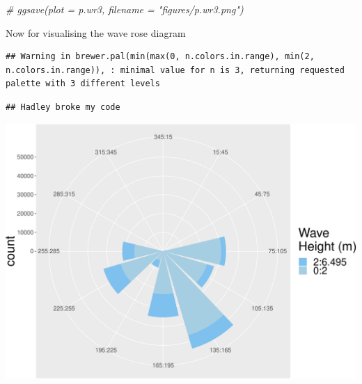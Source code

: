 \documentclass[10pt,A4,]{article}
\makeatletter
\newenvironment{Shaded}{\begin{snugshade}}{\end{snugshade}}
\newcommand{\KeywordTok}[1]{\textcolor[rgb]{0.13,0.29,0.53}{\textbf{#1}}}
\newcommand{\DataTypeTok}[1]{\textcolor[rgb]{0.13,0.29,0.53}{#1}}
\newcommand{\StringTok}[1]{\textcolor[rgb]{0.31,0.60,0.02}{#1}}
\newcommand{\CommentTok}[1]{\textcolor[rgb]{0.56,0.35,0.01}{\textit{#1}}}
\newcommand{\OperatorTok}[1]{\textcolor[rgb]{0.81,0.36,0.00}{\textbf{#1}}}
\newcommand{\NormalTok}[1]{#1}
\def\maxwidth{\ifdim\Gin@nat@width>\linewidth\linewidth
\else\Gin@nat@width\fi}
\let\Oldincludegraphics\includegraphics
\renewcommand{\includegraphics}[1]{\Oldincludegraphics[width=\maxwidth]{#1}}
\makeatother
\begin{document}
\begin{Shaded}
\begin{Highlighting}[]
\CommentTok{# ggsave(plot = p.wr3, filename = "figures/p.wr3.png")}
\end{Highlighting}
\end{Shaded}

Now for visualising the wave rose diagram

\begin{Shaded}
\end{Shaded}

\begin{verbatim}
## Warning in brewer.pal(min(max(0, n.colors.in.range), min(2, n.colors.in.range)), : minimal value for n is 3, returning requested palette with 3 different levels
\end{verbatim}

\begin{verbatim}
## Hadley broke my code
\end{verbatim}

\includegraphics{appendices_files/figure-latex/Waverose diagram -1.pdf}
\end{document}
